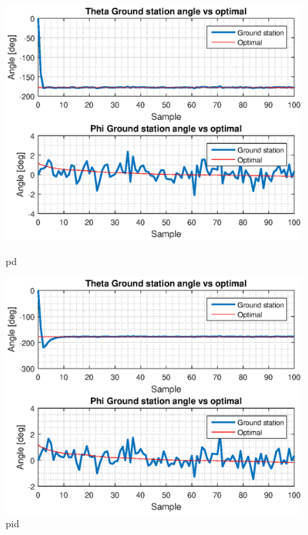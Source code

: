 \begin{figure}[H]
\vspace*{0.5cm} %
\begin{minipage}[t]{0.45\textwidth}
\includegraphics[width=\linewidth]{figures/s2_pd_gs_theta_phi_optimal.eps}
\caption{pd}
\label{fig:s2_gs_pd}
\end{minipage}
\hspace{\fill}
\begin{minipage}[t]{0.45\textwidth}
\includegraphics[width=\linewidth]{figures/s2_pid_gs_theta_phi_optimal.eps}
\caption{pid}
\label{fig:s2_gs_pid}
\end{minipage}

\end{figure}

